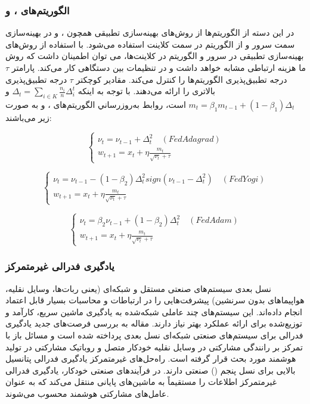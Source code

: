 \subsubsection{الگوریتم‌های ،  و }

در این دسته از الگوریتم‌ها از روش‌های بهینه‌سازی تطبیقی همچون ،  و  در بهینه‌سازی سمت سرور و از الگوریتم  در سمت کلاینت استفاده می‌شود. با استفاده از روش‌های بهینه‌سازی تطبیقی در سرور و الگوریتم  در کلاینت‌ها، می توان اطمینان داشت که روش ما هزینه ارتباطی مشابه  خواهد داشت و در تنظیمات بین دستگاهی کار می‌کند. پارامتر $\tau$ درجه تطبیق‌پذیری الگوریتم‌ها را کنترل می‌کند. مقادیر کوچکتر $\tau$ درجه تطبیق‌پذیری بالاتری را ارائه می‌دهند. با توجه به اینکه $\Delta_t=\sum_{i\in K}\frac{n_i}{n}\Delta_i^t$ و $m_t=\beta_1 m_{t-1}+(1-\beta_1)\Delta_t$ است، روابط به‌روزرساني الگوریتم‌های ،  و  به صورت زیر می‌باشند:


\begin{equation}\label{e124}
	\begin{cases}
		\nu_t =\nu_{t-1}+\Delta_t^2 \quad (FedAdagrad)\\
		w_{t+1}=x_t+\eta\frac{m_t}{\sqrt{\nu_t}+\tau}
	\end{cases}
\end{equation}

\begin{equation}\label{e125}
	\begin{cases}
		\nu_t =\nu_{t-1}-(1-\beta_2)\Delta_t^2 sign(\nu_{t-1}-\Delta_t^2) \quad (FedYogi)\\
		w_{t+1}=x_t+\eta\frac{m_t}{\sqrt{\nu_t}+\tau}
	\end{cases}
\end{equation}

\begin{equation}\label{e126}
	\begin{cases}
		\nu_t =\beta_2\nu_{t-1}+(1-\beta_2)\Delta_t^2 \quad (FedAdam)\\
		w_{t+1}=x_t+\eta\frac{m_t}{\sqrt{\nu_t}+\tau}
	\end{cases}
\end{equation}

\subsubsection{یادگیری فدرالی غیرمتمرکز}
نسل بعدی سیستم‌های صنعتی مستقل و شبکه‌ای (یعنی ربات‌ها، وسایل نقلیه، هواپیماهای بدون سرنشین) پیشرفت‌هایی را در ارتباطات و محاسبات بسیار قابل اعتماد انجام داده‌اند. این سیستم‌های چند عاملی شبکه‌شده به یادگیری ماشین سریع، کارآمد و توزیع‌شده برای ارائه عملکرد بهتر نیاز دارند. مقاله \cite{Fed9} به بررسی فرصت‌های جدید یادگیری فدرالی برای سیستم‌های صنعتی شبکه‌ای نسل بعدی پرداخته شده است و مسائل باز با تمرکز بر رانندگی مشارکتی در وسایل نقلیه خودکار متصل و روباتیک مشارکتی در تولید هوشمند مورد بحث قرار گرفته است. راه‌حل‌های غیرمتمرکز یادگیری فدرالی پتانسیل بالایی برای نسل پنجم () صنعتی دارند. در فرآیندهای صنعتی خودکار، یادگیری فدرالی غیرمتمرکز اطلاعات را مستقیماً به ماشین‌های پایانی منتقل می‌کند که به عنوان عامل‌های مشارکتی هوشمند محسوب می‌شوند.

